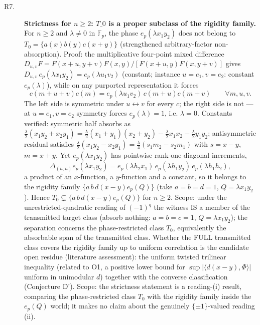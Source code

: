 \documentclass[11pt]{article}
\begin{document}
\begin{description}
\item[R7.] \textbf{Strictness for $n\geq2$: $T\_0$ is a proper subclass of the rigidity family.} For $n\ge2$ and $\lambda\neq0$ in $\mathbb{F}_p$, the phase $e_p(\lambda x_1y_2)$ does not belong to $T_0=\{a(x)b(y)c(x+y)\}$ (strengthened arbitrary-factor non-absorption). Proof: the multiplicative four-point mixed difference $D_{u,v}F=F(x+u,y+v)F(x,y)/[F(x+u,y)F(x,y+v)]$ gives $D_{u,v}\,e_p(\lambda x_1y_2)=e_p(\lambda u_1v_2)$ (constant; instance $u=e_1,v=e_2$: constant $e_p(\lambda)$), while on any purported representation it forces $$c(m+u+v)c(m)=e_p(\lambda u_1v_2)\,c(m+u)c(m+v)\qquad\forall m,u,v.$$ The left side is symmetric under $u\leftrightarrow v$ for every $c$; the right side is not — at $u=e_1,v=e_2$ symmetry forces $e_p(\lambda)=1$, i.e. $\lambda=0$. Constants verified: symmetric half absorbs as $\tfrac{\lambda}{2}(x_1y_2+x_2y_1)=\tfrac{\lambda}{2}(x_1+y_1)(x_2+y_2)-\tfrac{\lambda}{2}x_1x_2-\tfrac{\lambda}{2}y_1y_2$; antisymmetric residual satisfies $\tfrac{\lambda}{2}(x_1y_2-x_2y_1)=\tfrac{\lambda}{4}(s_1m_2-s_2m_1)$ with $s=x-y$, $m=x+y$. Yet $e_p(\lambda x_1y_2)$ has pointwise rank-one diagonal increments, $$\Delta_{(h,h)}e_p(\lambda x_1y_2)=e_p(\lambda h_2x_1)\,e_p(\lambda h_1y_2)\,e_p(\lambda h_1h_2),$$ a product of an $x$-function, a $y$-function and a constant, so it belongs to the rigidity family $\{a\,b\,d(x-y)e_p(Q)\}$ (take $a=b=d=1$, $Q=\lambda x_1y_2$). Hence $T_0\subsetneq\{a\,b\,d(x-y)e_p(Q)\}$ for $n\ge2$. Scope: under the unrestricted-quadratic reading of $(-1)^q$ the witness IS a member of the transmitted target class (absorb nothing: $a=b=c=1$, $Q=\lambda x_1y_2$); the separation concerns the phase-restricted class $T_0$, equivalently the absorbable span of the transmitted class. Whether the FULL transmitted class covers the rigidity family up to uniform correlation is the candidate open residue (literature assessment): the uniform twisted trilinear inequality (related to O1, a positive lower bound for $\sup|\langle d(x-y),\Phi\rangle|$ uniform in unimodular $d$) together with the converse classification (Conjecture D'). Scope: the strictness statement is a reading-(i) result, comparing the phase-restricted class $T_0$ with the rigidity family inside the $e_p(Q)$ world; it makes no claim about the genuinely $\{\pm1\}$-valued reading (ii).

\end{description}
\end{document}
